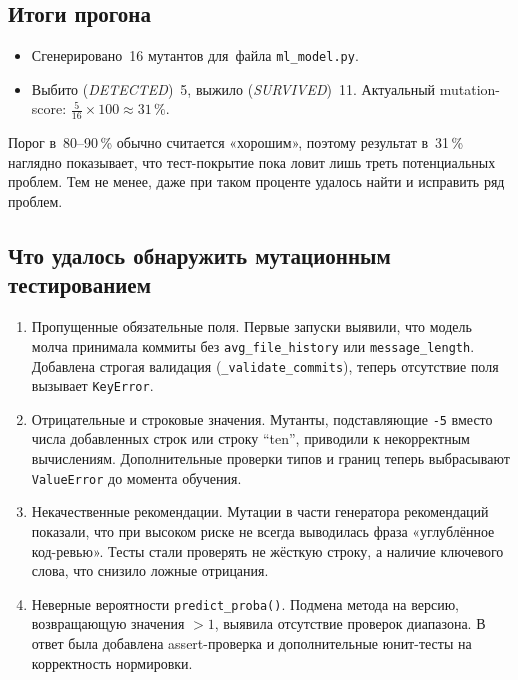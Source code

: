 \vspace{0.7em}
\subsection{Итоги прогона}

\begin{itemize}
	\item Сгенерировано~16 мутантов для~файла \texttt{ml\_model.py}.
	\item Выбито (\textit{DETECTED})~5, выжило (\textit{SURVIVED})~11.  
	Актуальный mutation-score: $\frac{5}{16}\!\times\!100 \approx 31\,\%$.
\end{itemize}

Порог в~80--90\,\% обычно считается «хорошим»,
поэтому результат в~31\,\% наглядно показывает,
что тест-покрытие пока ловит лишь треть потенциальных проблем.
Тем не менее, даже при таком проценте удалось найти и исправить ряд проблем.

\vspace{0.7em}
\subsection{Что удалось обнаружить мутационным тестированием}

\begin{enumerate}
	\item Пропущенные обязательные поля.
	Первые запуски выявили, что модель молча принимала коммиты без
	\verb|avg_file_history| или \verb|message_length|.  
	Добавлена строгая валидация (\verb|_validate_commits|),
	теперь отсутствие поля вызывает \verb|KeyError|.
	
	\item Отрицательные и строковые значения.
	Мутанты, подставляющие \verb|-5| вместо числа добавленных строк
	или строку ``ten'', приводили к некорректным вычислениям.
	Дополнительные проверки типов и границ теперь
	выбрасывают \verb|ValueError| до момента обучения.
	
	\item Некачественные рекомендации.
	Мутации в части генератора рекомендаций показали,
	что при высоком риске не всегда выводилась фраза
	«углублённое код-ревью». Тесты стали проверять
	не жёсткую строку, а наличие ключевого слова,
	что снизило ложные отрицания.
	
	\item Неверные вероятности \texttt{predict\_proba()}.
	Подмена метода на версию, возвращающую значения $>1$,
	выявила отсутствие проверок диапазона.  
	В ответ была добавлена assert-проверка и дополнительные
	юнит-тесты на корректность нормировки.
\end{enumerate}

